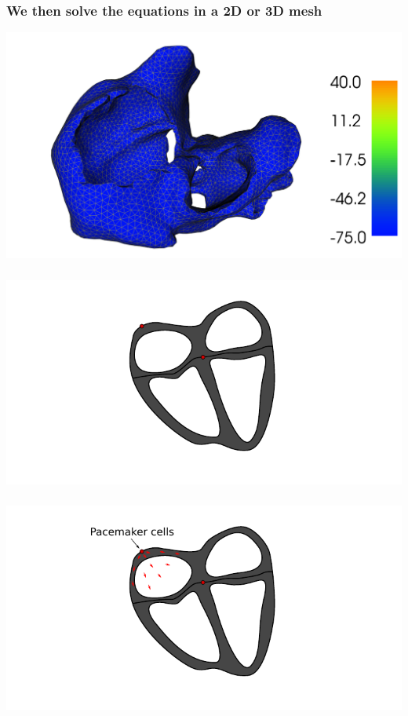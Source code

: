 \documentclass[norsk, 12pt]{beamer}
\begin{document}
\begin{frame}[fragile]
\frametitle{We then solve the equations in a 2D or 3D mesh}
\begin{center}
\includegraphics[width=\textwidth]{snapshot0}
\end{center}

\end{frame}


\begin{frame}[fragile]
\frametitle{}
\begin{center}
\includegraphics[width=\textwidth]{ecg0}
\end{center}
\end{frame}

\begin{frame}[fragile]
\frametitle{}
\begin{center}
\includegraphics[width=\textwidth]{ecg1}
\end{center}
\end{frame}
\end{document}
